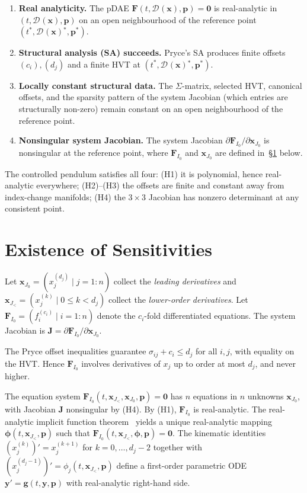 \documentclass[12pt,a4paper]{article}
\theoremstyle{definition}
\theoremstyle{plain}
\theoremstyle{remark}
\newcommand{\vx}{\mathbf{x}}
\newcommand{\vp}{\mathbf{p}}
\newcommand{\vF}{\mathbf{F}}
\newcommand{\Jb}{\mathbf{J}}
\newcommand{\vzero}{\mathbf{0}}
\newcommand{\vy}{\mathbf{y}}
\newcommand{\vg}{\mathbf{g}}
\newcommand{\vphi}{\boldsymbol{\phi}}
\newcommand{\derof}[2]{\mathcal{D}_{#1}\!\left(#2\right)\!}
\begin{document}
\begin{enumerate}[label=(H\arabic*)]
  \item \textbf{Real analyticity.} The pDAE $\vF(t,\derof{}\vx,\vp)=\vzero$ is real-analytic in $(t,\derof{}\vx,\vp)$ on an open neighbourhood of the reference point $(t^*,\derof{}\vx^*,\vp^*)$.
  \item \textbf{Structural analysis (SA) succeeds.} Pryce's SA produces finite offsets $(c_i),(d_j)$ and a finite HVT at $(t^*,\derof{}\vx^*,\vp^*)$.
  \item \textbf{Locally constant structural data.} The $\Sigma$-matrix, selected HVT, canonical offsets, and the sparsity pattern of the system Jacobian (which entries are structurally non-zero) remain constant on an open neighbourhood of the reference point.
  \item \textbf{Nonsingular system Jacobian.} The system Jacobian $\partial\vF_{I_0}/\partial\vx_{J_0}$ is nonsingular at the reference point, where $\vF_{I_0}$ and $\vx_{J_0}$ are defined in~\S\ref{sec:existence} below.
\end{enumerate}

The controlled pendulum satisfies all four: (H1) it is polynomial, hence real-analytic everywhere; (H2)--(H3) the offsets are finite and constant away from index-change manifolds; (H4) the $3\times 3$ Jacobian has nonzero determinant at any consistent point.

\section{Existence of Sensitivities}\label{sec:existence}

Let $\vx_{J_0} = (x_j^{(d_j)}\mid j=1:n)$ collect the \emph{leading derivatives} and $\vx_{J_<} = (x_j^{(k)}\mid 0\le k < d_j)$ collect the \emph{lower-order derivatives}. Let $\vF_{I_0} = (f_i^{(c_i)}\mid i=1:n)$ denote the $c_i$-fold differentiated equations. The system Jacobian is $\Jb = \partial\vF_{I_0}/\partial\vx_{J_0}$.

The Pryce offset inequalities guarantee $\sigma_{ij} + c_i \le d_j$ for all $i,j$, with equality on the HVT. Hence $\vF_{I_0}$ involves derivatives of $x_j$ up to order at most $d_j$, and never higher.

The equation system $\vF_{I_0}(t,\vx_{J_<},\vx_{J_0},\vp)=\vzero$ has $n$ equations in $n$ unknowns $\vx_{J_0}$, with Jacobian $\Jb$ nonsingular by (H4). By (H1), $\vF_{I_0}$ is real-analytic. The real-analytic implicit function theorem~\cite{krantz2002implicit} yields a unique real-analytic mapping $\vphi(t,\vx_{J_<},\vp)$ such that $\vF_{I_0}(t,\vx_{J_<},\vphi,\vp)=\vzero$. The kinematic identities $(x_j^{(k)})' = x_j^{(k+1)}$ for $k=0,\dots,d_j-2$ together with $(x_j^{(d_j-1)})' = \phi_j(t,\vx_{J_<},\vp)$ define a first-order parametric ODE $\vy' = \vg(t,\vy,\vp)$ with real-analytic right-hand side.
\end{document}
